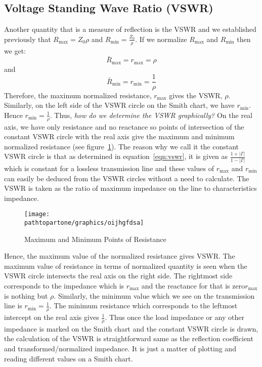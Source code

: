 \subsection{Voltage Standing Wave Ratio (VSWR)}
Another quantity that is a measure of reflection is the VSWR and we established previously that $R_\max = Z_0\rho$ and $R_\min = \frac{Z_0}{\rho}$. If we normalize $R_\max$ and $R_\min$ then we get:
\begin{equation}
\bar{R}_\max = r_\max = {\rho}
\end{equation}
and
\begin{equation}
\bar{R}_\min = r_\min = \frac{1}{\rho}
\end{equation}
Therefore, the maximum normalized resistance, $r_\max$ gives the VSWR, $\rho$. Similarly, on the left side of the VSWR circle on the Smith chart, we have $r_\min$. Hence $r_\min = \frac{1}{\rho}$. Thus, \emph{how do we determine the VSWR graphically?} On the real axis, we have only resistance and no reactance so points of intersection of the constant VSWR circle with the real axis give the maximum and minimum normalized resistance (see figure~\ref{fig:oijhgfdsa}). The reason why we call it the constant VSWR circle is that as determined in equation~\eqref{eqn:vswr}, it is given as $\frac{1 + |\Gamma|}{1 - |\Gamma|}$ which is constant for a lossless transmission line and these values of $r_\max$ and $r_\min$ can easily be deduced from the VSWR circles without a need to calculate. The VSWR is taken as the ratio of maximum impedance on the line to characteristics impedance.
\begin{figure}[h]
\centering
\texttt{[image: \\pathtopartone/graphics/oijhgfdsa]}
\caption{Maximum and Minimum Points of Resistance}
\label{fig:oijhgfdsa}
\end{figure}

Hence, the maximum value of the normalized resistance gives VSWR. The maximum value of resistance in terms of normalized quantity is seen when the VSWR circle intersects the real axis on the right side. The rightmost side corresponds to the impedance which is $r_\max$ and the reactance for that is zero\textemdash\;$r_\max$ is nothing but $\rho$. Similarly, the minimum value which we see on the transmission line is $r_\min = \frac{1}{\rho}$. The minimum resistance which corresponds to the leftmost intercept on the real axis gives $\frac{1}{\rho}$. Thus once the load impedance or any other impedance is marked on the Smith chart and the constant VSWR circle is drawn, the calculation of the VSWR is straightforward same as the reflection coefficient and transformed/normalized impedance. It is just a matter of plotting and reading different values on a Smith chart.

